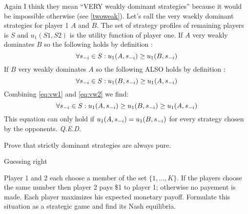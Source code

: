 \documentclass[../main.tex]{subfiles}
\begin{document}
\begin{solution}
	Again I think they mean ``VERY weakly dominant strategies'' because it would be impossible otherwise (see \autoref{twoweak}).
	Let's call the very waekly dominant strategies for player 1 $A$ and $B$.
	The set of strategy profiles of remaining players is $S$ and $u_1(S1,S2)$ is the utility function of player one.
	If $A$ very weakly dominates $B$ so the following holds by definition :
	\begin{equation}
		\label{eq:vw1}
		\forall s_{\--i} \in S : u_1(A,s_{\--i}) \geq u_1(B,s_{\--i})
	\end{equation}
	If $B$ very weakly dominates $A$ so the following ALSO holds by definition :
	\begin{equation}
		\label{eq:vw2}
		\forall s_{\--i} \in S : u_1(B,s_{\--i}) \geq u_1(A,s_{\--i})
	\end{equation}
	Combining \autoref{eq:vw1} and \autoref{eq:vw2} we find:
	\begin{equation}
		\forall s_{\--i} \in S : u_1(A,s_{\--i}) \geq u_1(B,s_{\--i}) \geq u_1(A,s_{\--i})
	\end{equation}
	This equation can only hold if $u_1(A,s_{\--i}) = u_1(B,s_{\--i})$ for every strategy chosen by the opponents. \textit{Q.E.D.}
\end{solution}

\begin{question}
	Prove that strictly dominant strategies are always pure. 
\end{question}

\begin{solution}

\end{solution}

\begin{question}
	Guessing right

	Player 1 and 2 each choose a member of the set $\{1,\ldots,K\}$. If the players choose the same number then player 2 pays \$1 to player 1; otherwise no payement is made. Each player maximizes his expected monetary payoff. Formulate this situation as a strategic game and find its Nash equilibria.
\end{question}

\begin{solution}

\end{solution}
\end{document}
